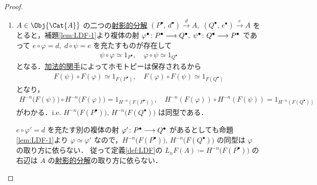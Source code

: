 \documentclass[algtopo_main]{subfiles}
\begin{document}
\begin{proof}
    \begin{enumerate}
        \item $A \in \Obj{\Cat{A}}$ の二つの\hyperref[def:projective-resolution]{射影的分解} $(P^\bullet,\, d^\bullet) \xrightarrow{d} A,\; (Q^\bullet,\, e^\bullet) \xrightarrow{e} A$ をとると，補題\ref{lem:LDF-1}より複体の射
        $\varphi^\bullet \colon P^\bullet \longrightarrow Q^\bullet,\; \psi^\bullet \colon Q^\bullet \longrightarrow P^\bullet$ であって $e \circ \varphi = d,\; d \circ \psi = e$ を充たすものが存在して
        \begin{align}
            \psi \circ \varphi \simeq 1_{P^\bullet},\quad \varphi \circ \psi \simeq 1_{Q^\bullet}
        \end{align}
        となる．\hyperref[def:Ab-func]{加法的関手}によってホモトピーは保存されるから
        \begin{align}
            F(\psi) \circ F(\varphi) \simeq 1_{F(P^\bullet)},\quad F(\varphi) \circ F(\psi) \simeq 1_{F(Q^\bullet)}
        \end{align}
        となり，
        \begin{align}
            H^{-n} \bigl( F(\psi) \bigr) \circ H^{-n}\bigl(F(\varphi)\bigr) = 1_{H^{-n}(F(P^\bullet))},\quad H^{-n}(F(\varphi)) \circ H^{-n}(F(\psi)) = 1_{H^{-n}(F(Q^\bullet))}
        \end{align}
        がわかる．i.e. $H^{-n} \bigl( F(P^\bullet) \bigr),\, H^{-n} \bigl( F(Q^\bullet) \bigr)$ は同型である．

        $e \circ \varphi' = d$ を充たす別の複体の射 $\varphi'\colon P^\bullet \longrightarrow Q^\bullet$ があるとしても命題\ref{lem:LDF-1}より $\varphi \simeq \varphi'$ なので，$H^{-n} \bigl( F(P^\bullet) \bigr),\, H^{-n} \bigl( F(Q^\bullet) \bigr)$ の同型は $\varphi$ の取り方に依らない．
        従って定義\ref{def:LDF}の $L_nF(A) \coloneqq H^{-n} \bigl( F(P^\bullet) \bigr)$ の右辺は $A$ の\hyperref[def:projective-resolution]{射影的分解}の取り方に依らない．


\end{enumerate}
\end{proof}
\end{document}
